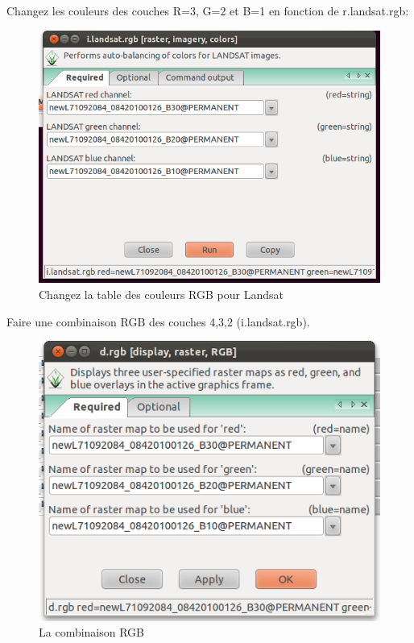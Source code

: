 Changez les couleurs des couches R=3, G=2 et B=1 en fonction de r.landsat.rgb:

\begin{figure}[htbp]
   \centering
   \includegraphics[scale=0.35]{grass_rs003.png}
   \caption{Changez la table des couleurs RGB pour Landsat}
   \label{fig:grass_rs003}
\end{figure}

Faire une combinaison RGB des couches 4,3,2 (i.landsat.rgb).

\begin{figure}[htbp]
   \centering
   \includegraphics[scale=0.45]{grass_rs004.png}
   \caption{La combinaison RGB}
   \label{fig:grass_rs004}
\end{figure}

